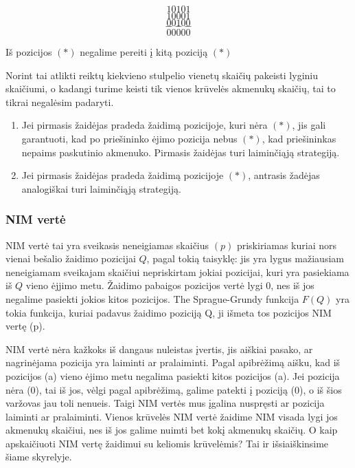 $$10101$$$$10001$$$$00100$$$$---$$$$00000$$

\begin{teig}
  Iš pozicijos $(*)$ negalime pereiti į kitą poziciją $(*)$
\end{teig}

Norint tai atlikti reiktų kiekvieno stulpelio vienetų skaičių pakeisti
lyginiu skaičiumi, o kadangi turime keisti tik vienos krūvelės akmenukų
skaičių, tai to tikrai negalėsim padaryti.

\begin{enumerate}
  \item Jei pirmasis žaidėjas pradeda žaidimą pozicijoje, kuri nėra $(*)$,
    jis gali garantuoti, kad po priešininko ėjimo pozicija nebus $(*)$, kad
    priešininkas nepaims paskutinio akmenuko. Pirmasis žaidėjas turi
    laiminčiąją strategiją.
  \item Jei pirmasis žaidėjas pradeda žaidimą pozicijoje $(*)$, antrasis
    žadėjas analogiškai turi laiminčiąją strategiją. 
\end{enumerate}


\subsubsection{NIM vertė}

\begin{api}
NIM vertė tai yra sveikasis neneigiamas skaičius $(p)$ priskiriamas kuriai nors vienai bešalio žaidimo pozicijai $Q$, pagal tokią taisyklę: jis yra lygus mažiausiam neneigiamam sveikajam skaičiui nepriskirtam jokiai
pozicijai, kuri yra pasiekiama iš $Q$ vieno ėjjimo metu. Žaidimo pabaigos
pozicijos vertė lygi $0$, nes iš jos negalime pasiekti jokios kitos
pozicijos. The Sprague-Grundy funkcija $F(Q)$ yra tokia funkcija, kuriai padavus žaidimo poziciją Q, ji išmeta tos pozicijos NIM vertę (p).  
\end{api}

NIM vertė nėra kažkoks iš dangaus nuleistas įvertis, jis aiškiai pasako, ar nagrinėjama pozicija yra laiminti ar pralaiminti. Pagal apibrėžimą aišku, kad iš pozicijos (a) vieno ėjimo metu negalima pasiekti kitos pozicijos (a). Jei pozicija nėra (0), tai iš jos, vėlgi pagal apibrėžimą, galime patekti į poziciją (0), o iš šios varžovas jau toli nenueis. Taigi NIM vertės mus įgalina nuspręsti ar pozicija laiminti ar pralaiminti. Vienos krūvelės NIM vertė žaidime NIM visada lygi jos akmenukų skaičiui, nes iš jos galime nuimti bet kokį akmenukų skaičių. O kaip apskaičiuoti NIM vertę žaidimui su keliomis krūvelėmis? Tai ir išsiaiškinsime šiame skyrelyje. 

